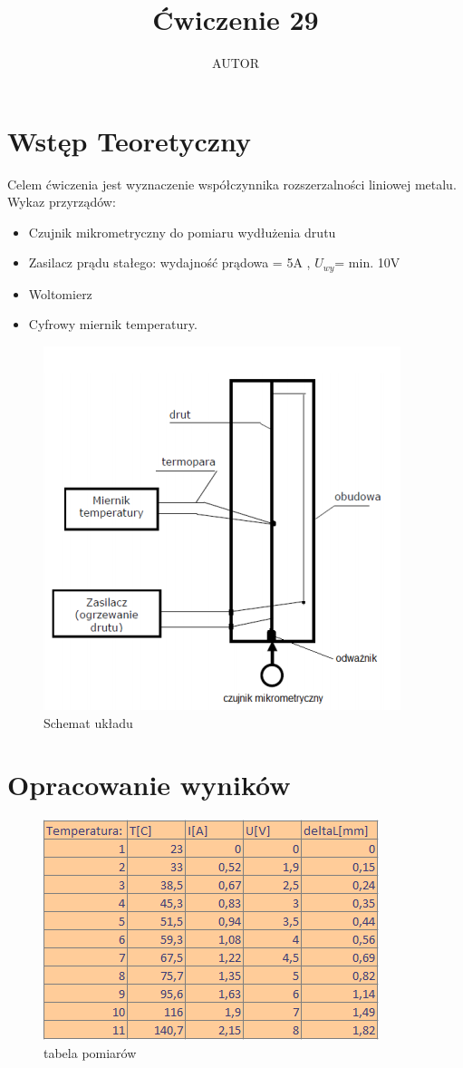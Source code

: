 \documentclass{article}
\title{Ćwiczenie 29}
\author{AUTOR}
\date{}
\begin{document}
\maketitle

\section{Wstęp Teoretyczny}
Celem ćwiczenia jest wyznaczenie współczynnika rozszerzalności liniowej metalu.\\
Wykaz przyrządów:
\begin{itemize}
    \item Czujnik mikrometryczny do pomiaru wydłużenia drutu
    \item Zasilacz prądu stałego: wydajność prądowa = 5A , $U_{wy}$= min. 10V
    \item Woltomierz
    \item Cyfrowy miernik temperatury.
\end{itemize}


\begin{figure}[h!]
    \centering
    \includegraphics[scale=0.9]{xd.PNG}
    \caption{Schemat układu}
\end{figure}

\section{Opracowanie wyników}
\begin{figure}[h!]
    \centering
    \includegraphics[scale=0.9]{wykresik.PNG}
    \caption{tabela pomiarów}
\end{figure}
\end{document}
